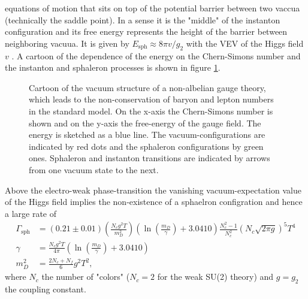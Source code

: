 \documentclass[13pt,a4paper,titlepage]{article}
\begin{document}
equations of motion that sits on top of the potential barrier between two vaccua (technically the saddle point). In a sense it is the "middle" of the instanton configuration and its free energy represents the height of the barrier between
neighboring vacuua.
It is given by $E_{\mathrm{sph}} \approx 8\pi v / g_2$ with the VEV of the Higgs field $v$ \cite[eq. 4.5]{Cline:2006ts_Baryogenesis}.
A cartoon of the dependence of the energy on the Chern-Simons number and the instanton and sphaleron processes is shown in figure \ref{fig:sphaleron_cartoon}.
\begin{figure}[H]
    \label{fig:sphaleron_cartoon}
    \centering
    \caption{Cartoon of the vacuum structure of a non-albelian gauge theory, which leads to the non-conservation of baryon and lepton numbers in the standard model.
    On the x-axis the Chern-Simons number is shown and on the y-axis the free-energy of the gauge field.
    The energy is sketched as a blue line. The vacuum-configurations are indicated by red dots and the sphaleron configurations by green ones. Sphaleron and instanton transitions are indicated by arrows from one vacuum state
    to the next.
    }
\end{figure}

\noindent
Above the electro-weak phase-transition the vanishing vacuum-expectation value of the Higgs field implies the non-existence of a sphaelron configration and hence a large rate of \cite{sphaleron_rate_symmetric_phase_Moore_2011}
\begin{align}
    \Gamma_{\mathrm{sph}} &= (0.21 \pm 0.01) \left(\frac{N_c g^2 T}{m_D^2} \right) \left(\ln \left(\frac{m_D}{\gamma} \right) + 3.0410 \right) \frac{N_c^2 - 1}{N_c^2} (N_c \sqrt{2 \pi g})^5 T^4 \\
    \gamma &= \frac{N_c g^2 T}{4 \pi} \left(\ln \left(\frac{m_D}{\gamma}\right) + 3.0410 \right) \\
    m_D^2 &= \frac{2N_c + N_f}{6} g^2 T^2,
\end{align}
where $N_c$ the number of "colors" ($N_c = 2$ for the weak SU(2) theory) and $g = g_2$ the coupling constant.
\end{document}
